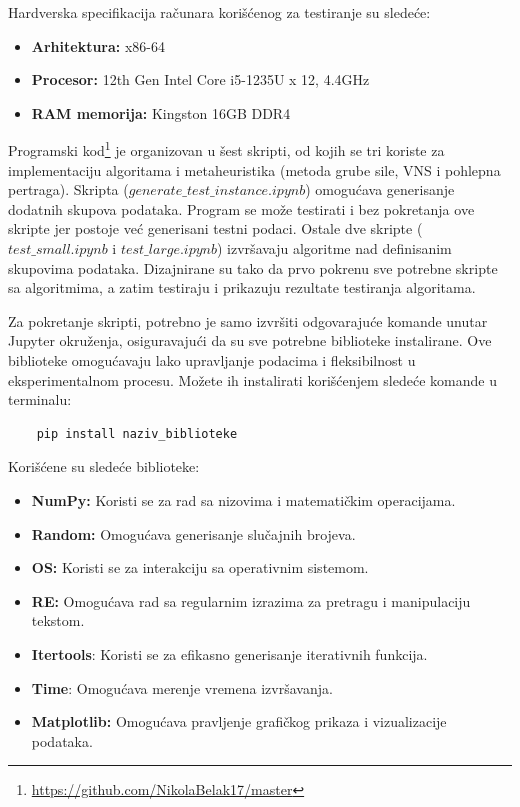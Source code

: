 \documentclass[12pt,oneside]{memoir}
\begin{document}
Hardverska specifikacija računara korišćenog za testiranje su sledeće:
\begin{itemize}
    \item \textbf{Arhitektura:} x86-64
    \item \textbf{Procesor:} 12th Gen Intel Core i5-1235U x 12, 4.4GHz
    \item \textbf{RAM memorija:} Kingston 16GB DDR4
\end{itemize}

Programski kod\footnote{\url{https://github.com/NikolaBelak17/master}} je organizovan u šest skripti, od kojih se tri koriste za implementaciju algoritama i metaheuristika (metoda grube sile, VNS i pohlepna pertraga). Skripta ($generate\_test\_instance.ipynb$) omogućava generisanje dodatnih skupova podataka. Program se može testirati i bez pokretanja ove skripte jer postoje već generisani testni podaci. Ostale dve skripte ($test\_small.ipynb$ i $test\_large.ipynb$) izvršavaju algoritme nad definisanim skupovima podataka. Dizajnirane su tako da prvo pokrenu sve potrebne skripte sa algoritmima, a zatim testiraju i prikazuju rezultate testiranja algoritama.

Za pokretanje skripti, potrebno je samo izvršiti odgovarajuće komande unutar Jupyter okruženja, osiguravajući da su sve potrebne biblioteke instalirane. Ove biblioteke omogućavaju lako upravljanje podacima i fleksibilnost u eksperimentalnom procesu. Možete ih instalirati korišćenjem sledeće komande u terminalu:
\begin{verbatim}
    pip install naziv_biblioteke
\end{verbatim}
Korišćene su sledeće biblioteke: 
\begin{itemize}
    \item \textbf{NumPy:} Koristi se za rad sa nizovima i matematičkim operacijama.
    \item \textbf{Random:} Omogućava generisanje slučajnih brojeva.
    \item \textbf{OS:} Koristi se za interakciju sa operativnim sistemom.
    \item \textbf{RE:} Omogućava rad sa regularnim izrazima za pretragu i manipulaciju tekstom.
    \item \textbf{Itertools}: Koristi se za efikasno generisanje iterativnih funkcija.
    \item \textbf{Time}: Omogućava merenje vremena izvršavanja.
    \item \textbf{Matplotlib:} Omogućava pravljenje grafičkog prikaza i vizualizacije podataka.
\end{itemize}
\end{document}
